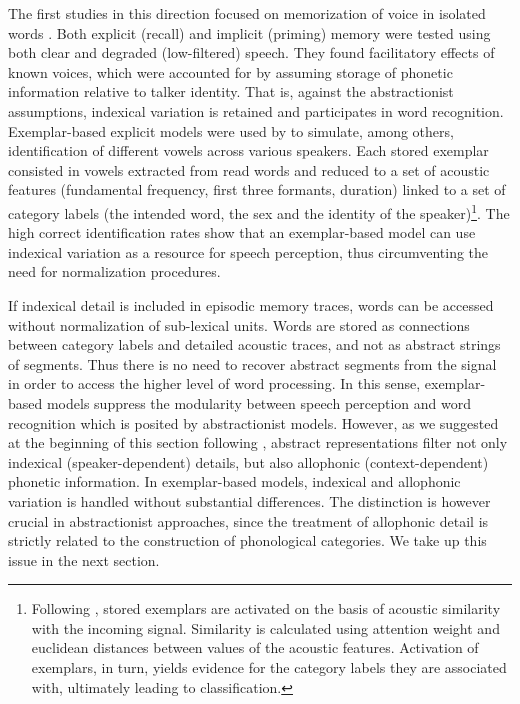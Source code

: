 The first studies in this direction focused on memorization of voice in isolated words \citep{goldinger1991nature,schacter1992auditory,palmeri1993episodic,church1994perceptual,goldinger1996words}. Both explicit (recall) and implicit (priming) memory were tested using both clear and degraded (low-filtered) speech. They found facilitatory effects of known voices, which were accounted for by assuming storage of phonetic information relative to talker identity. That is, against the abstractionist assumptions, indexical variation is retained and participates in word recognition. Exemplar-based explicit models were used by \citet{johnson1997speech} to simulate, among others, identification of different vowels across various speakers. Each stored exemplar consisted in vowels extracted from read words and reduced to a set of acoustic features (fundamental frequency, first three formants, duration) linked to a set of category labels (the intended word, the sex and the identity of the speaker)\footnote{Following \citet{nosofsky1988exemplar}, stored exemplars are activated on the basis of acoustic similarity with the incoming signal. Similarity is calculated using attention weight and euclidean distances between values of the acoustic features. Activation of exemplars, in turn, yields evidence for the category labels they are associated with, ultimately leading to classification.}. The high correct identification rates show that an exemplar-based model can use indexical variation as a resource for speech perception, thus circumventing the need for normalization procedures.

If indexical detail is included in episodic memory traces, words can be accessed without normalization of sub-lexical units. Words are stored as connections between category labels and detailed acoustic traces, and not as abstract strings of segments. Thus there is no need to recover abstract segments from the signal in order to access the higher level of word processing. In this sense, exemplar-based models suppress the modularity between speech perception and word recognition which is posited by abstractionist models. However, as we suggested at the beginning of this section following \citet{luce2003abstractness}, abstract representations filter not only indexical (speaker-dependent) details, but also allophonic (context-dependent) phonetic information. In exemplar-based models, indexical and allophonic variation is handled without substantial differences. The distinction is however crucial in abstractionist approaches, since the treatment of allophonic detail is strictly related to the construction of phonological categories. We take up this issue in the next section.

